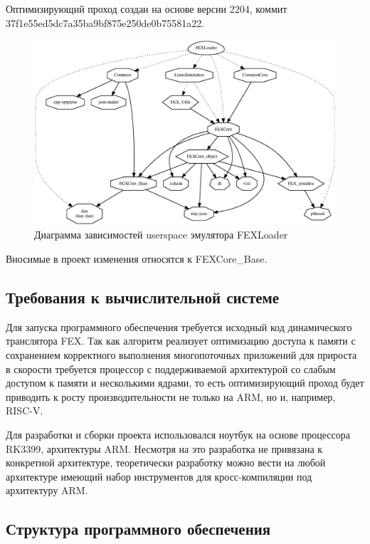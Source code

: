 Оптимизирующий проход создан на основе версии 2204, коммит \\ 37f1e55ed5dc7a35ba9bf875e250de0b75581a22.

\begin{figure}[hbtp]
	\centering
	\includegraphics[width=\textwidth]{img/loader.eps}
	\caption{Диаграмма зависимостей userspace эмулятора FEXLoader}
	\label{fig:box64sig}
\end{figure}

Вносимые в проект изменения относятся к FEXCore\_Base.

\subsection{Требования к вычислительной системе}

Для запуска программного обеспечения требуется исходный код динамического транслятора FEX. Так как алгоритм реализует оптимизацию доступа к памяти с сохранением корректного выполнения многопоточных приложений для прироста в скорости требуется процессор с поддерживаемой архитектурой со слабым доступом к памяти и несколькими ядрами, то есть оптимизирующий проход будет приводить к росту производительности не только на ARM, но и, например, RISC-V.

Для разработки и сборки проекта использовался ноутбук на основе процессора RK3399, архитектуры ARM. Несмотря на это разработка не привязана к конкретной архитектуре, теоретически разработку можно вести на любой архитектуре имеющий набор инструментов для кросс-компиляции под архитектуру ARM.

\subsection{Структура программного обеспечения}

